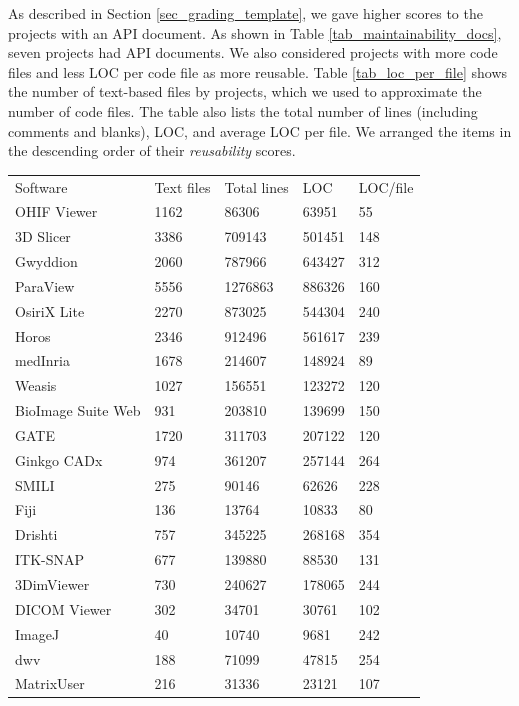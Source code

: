 \documentclass[preprint,12pt,authoryear]{elsarticle}
\begin{document}
As described in Section \ref{sec_grading_template}, we gave higher scores to the
projects with an API document. As shown in Table \ref{tab_maintainability_docs},
seven projects had API documents. We also considered projects with more code
files and less LOC per code file as more reusable. Table \ref{tab_loc_per_file}
shows the number of text-based files by projects, which we used to approximate
the number of code files. The table also lists the total number of lines
(including comments and blanks), LOC, and average LOC per file. We arranged the
items in the descending order of their \textit{reusability} scores. 

\begin{table}[ht]
\centering
\begin{tabular}{lllll}
\hline
\multirow{2}{*}{Software} & \multirow{2}{*}{Text files} & \multirow{2}{*}{Total lines} & \multirow{2}{*}{LOC} & \multirow{2}{*}{LOC/file} \\
 &  &  &  &  \\ \hline
OHIF Viewer & 1162 & 86306 & 63951 & 55 \\
3D Slicer & 3386 & 709143 & 501451 & 148 \\
Gwyddion & 2060 & 787966 & 643427 & 312 \\
ParaView & 5556 & 1276863 & 886326 & 160 \\
OsiriX Lite & 2270 & 873025 & 544304 & 240 \\
Horos & 2346 & 912496 & 561617 & 239 \\
medInria & 1678 & 214607 & 148924 & 89 \\
Weasis & 1027 & 156551 & 123272 & 120 \\
BioImage Suite Web & 931 & 203810 & 139699 & 150 \\
GATE & 1720 & 311703 & 207122 & 120 \\
Ginkgo CADx & 974 & 361207 & 257144 & 264 \\
SMILI & 275 & 90146 & 62626 & 228 \\
Fiji & 136 & 13764 & 10833 & 80 \\
Drishti & 757 & 345225 & 268168 & 354 \\
ITK-SNAP & 677 & 139880 & 88530 & 131 \\
3DimViewer & 730 & 240627 & 178065 & 244 \\
DICOM Viewer & 302 & 34701 & 30761 & 102 \\
ImageJ & 40 & 10740 & 9681 & 242 \\
dwv & 188 & 71099 & 47815 & 254 \\
MatrixUser & 216 & 31336 & 23121 & 107 \\

\end{tabular}
\end{table}
\end{document}
